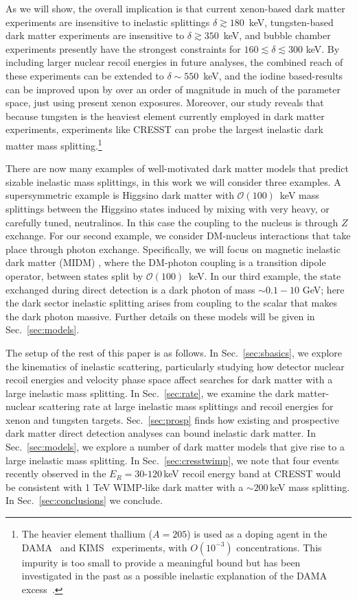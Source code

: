 \documentclass[11pt]{article}
\newcommand{\ltap}{\lesssim}
\begin{document}
As we will show, the overall implication is that current xenon-based dark matter experiments are insensitive to inelastic splittings $\delta \gtrsim 180$~keV, tungsten-based dark matter experiments are insensitive to $\delta \gtrsim 350$~keV\@, and bubble chamber experiments presently have the strongest constraints for $160 \ltap \delta\ltap 300$ keV\@.  By including larger nuclear recoil energies in future analyses, the combined reach of these experiments can be extended to $\delta \sim 550$~keV\@, and the iodine based-results can be improved upon by over an order of magnitude in much of the parameter space, just using present xenon exposures. 
Moreover, our study reveals that because tungsten is the heaviest element currently employed in dark matter experiments, experiments like CRESST can probe the largest inelastic dark matter mass splitting.\footnote{The heavier element thallium ($A=205$) is used as a doping agent in the DAMA~\cite{Bernabei:2010mq} and KIMS~\cite{Kim:2012rza} experiments, with $O(10^{-3})$ concentrations.  This impurity is too small to provide a meaningful bound but has been investigated in the past as a possible inelastic explanation of the DAMA excess~\cite{Chang:2010pr}.}

There are now many examples of well-motivated dark matter models that predict sizable inelastic mass splittings, in this work we will consider three examples. A supersymmetric example is Higgsino dark matter with $\mathcal{O}(100)$~keV mass splittings between the Higgsino states induced by mixing with very heavy, or carefully tuned, neutralinos.  In this case the coupling to the nucleus is through $Z$ exchange.  For our second example, we consider DM-nucleus interactions that take place through photon exchange. Specifically, we will focus on magnetic inelastic dark matter (MIDM) \cite{Chang:2010en,Weiner:2012gm}, where the DM-photon coupling is a transition dipole operator, between states split by $\mathcal{O}(100)$~keV\@.  In our third example, the state exchanged during direct detection is a dark photon of mass $\sim 0.1-10$ GeV\@; here the dark sector inelastic splitting arises from coupling to the scalar that makes the dark photon massive.  Further details on these models will be given in Sec.~\ref{sec:models}.

The setup of the rest of this paper is as follows.  In Sec.~\ref{sec:sbasics}, we explore the kinematics of inelastic scattering, particularly studying how detector nuclear recoil energies and velocity phase space affect searches for dark matter with a large inelastic mass splitting.  In Sec.~\ref{sec:rate}, we examine the dark matter-nuclear scattering rate at large inelastic mass splittings and recoil energies for xenon and tungsten targets.  Sec.~\ref{sec:prosp} finds how existing and prospective dark matter direct detection analyses can bound inelastic dark matter.  In Sec.~\ref{sec:models}, we explore a number of dark matter models that give rise to a large inelastic mass splitting.  In Sec.~\ref{sec:cresstwimp}, we note that four events recently observed in the $E_{R}=30$-$120$\,keV recoil energy band at CRESST would be consistent with 1 TeV WIMP-like dark matter with a $\sim 200$\,keV mass splitting.  In Sec.~\ref{sec:conclusions} we conclude.
\end{document}
